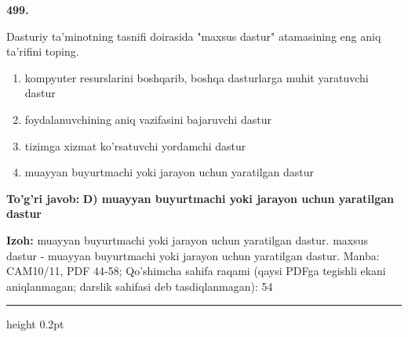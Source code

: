 \documentclass[10pt,a4paper]{article}
\begin{document}
{\bfseries\sffamily\color{ink} 499.}
\par
Dasturiy ta'minotning tasnifi doirasida "maxsus dastur" atamasining eng aniq ta'rifini toping.
\begin{enumerate}[label=\Alph*),leftmargin=9mm]
\item kompyuter resurslarini boshqarib, boshqa dasturlarga muhit yaratuvchi dastur
\item foydalanuvchining aniq vazifasini bajaruvchi dastur
\item tizimga xizmat ko'rsatuvchi yordamchi dastur
\item muayyan buyurtmachi yoki jarayon uchun yaratilgan dastur
\end{enumerate}
\begin{tcolorbox}[enhanced,breakable,colback=teal!4,colframe=teal!60!black,boxrule=0.45pt,arc=1.2mm,left=2.7mm,right=2.7mm,top=1.8mm,bottom=1.8mm,before skip=2mm,after skip=2mm]
{\bfseries\sffamily\color{teal}To'g'ri javob:} \textbf{D) muayyan buyurtmachi yoki jarayon uchun yaratilgan dastur}
\par\smallskip
{\bfseries Izoh:} muayyan buyurtmachi yoki jarayon uchun yaratilgan dastur. maxsus dastur - muayyan buyurtmachi yoki jarayon uchun yaratilgan dastur. Manba: CAM10/11, PDF 44-58; Qo'shimcha sahifa raqami (qaysi PDFga tegishli ekani aniqlanmagan; darslik sahifasi deb tasdiqlanmagan): 54
\end{tcolorbox}
\vspace{2mm}\hrule height 0.2pt\vspace{3mm}
\end{document}
